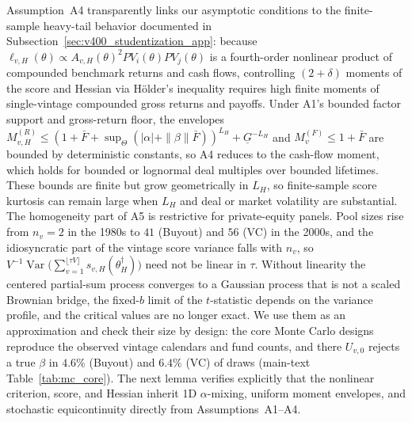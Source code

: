 Assumption~A4 transparently links our asymptotic conditions to the finite-sample heavy-tail behavior documented in Subsection~\ref{sec:v400_studentization_app}: because $\ell_{v,H}(\theta) \propto A_{v,H}(\theta)^2 PV_i(\theta) PV_j(\theta)$ is a fourth-order nonlinear product of compounded benchmark returns and cash flows, controlling $(2+\delta)$ moments of the score and Hessian via H\"older's inequality requires high finite moments of single-vintage compounded gross returns and payoffs. Under A1's bounded factor support and gross-return floor, the envelopes $M_{v,H}^{(R)} \le (1 + \bar{F} + \sup_{\Theta}(|\alpha| + \|\beta\|\bar{F}))^{L_H} + \underline{G}^{-L_H}$ and $M_v^{(F)} \le 1 + \bar{F}$ are bounded by deterministic constants, so A4 reduces to the cash-flow moment, which holds for bounded or lognormal deal multiples over bounded lifetimes. These bounds are finite but grow geometrically in $L_H$, so finite-sample score kurtosis can remain large when $L_H$ and deal or market volatility are substantial.
The homogeneity part of A5 is restrictive for private-equity panels. Pool sizes rise from $n_v = 2$ in the 1980s to $41$ (Buyout) and $56$ (VC) in the 2000s, and the idiosyncratic part of the vintage score variance falls with $n_v$, so $V^{-1}\operatorname{Var}\bigl(\sum_{v=1}^{\lfloor \tau V \rfloor} s_{v,H}(\theta_H^\dagger)\bigr)$ need not be linear in $\tau$. Without linearity the centered partial-sum process converges to a Gaussian process that is not a scaled Brownian bridge, the fixed-$b$ limit of the $t$-statistic depends on the variance profile, and the \citet{KV05} critical values are no longer exact. We use them as an approximation and check their size by design: the core Monte Carlo designs reproduce the observed vintage calendars and fund counts, and there $U_{v,0}$ rejects a true $\beta$ in $4.6\%$ (Buyout) and $6.4\%$ (VC) of draws (main-text Table~\ref{tab:mc_core}).
The next lemma verifies explicitly that the nonlinear criterion, score, and Hessian inherit 1D $\alpha$-mixing, uniform moment envelopes, and stochastic equicontinuity directly from Assumptions~A1--A4.

